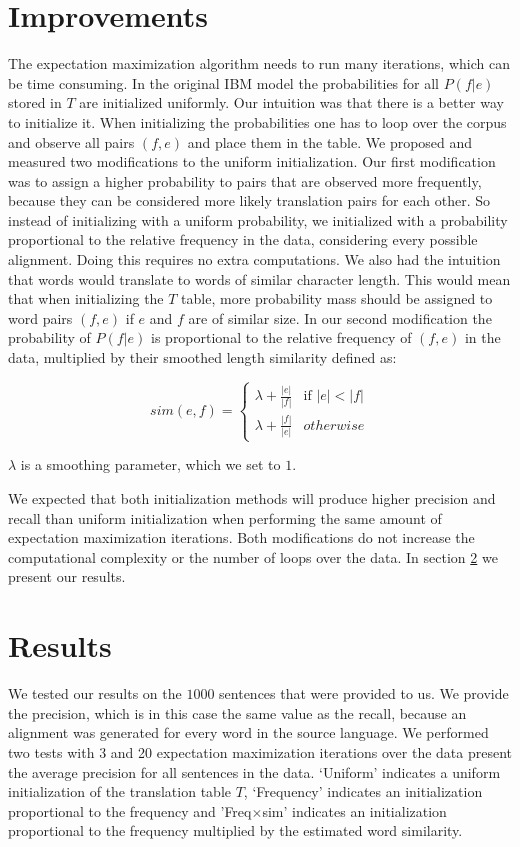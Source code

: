 \documentclass[11pt]{article}
\begin{document}
\section{Improvements}
\label{own}
The expectation maximization algorithm needs to run many iterations, which can be time consuming. In the original IBM model the probabilities for all $P(f|e)$ stored in $T$ are initialized uniformly. Our intuition was that there is a better way to initialize it. When initializing the probabilities one has to loop over the corpus and observe all pairs $(f,e)$ and place them in the table. We proposed and measured two modifications to the uniform initialization.
Our first modification was to assign a higher probability to pairs that are observed more frequently, because they can be considered more likely translation pairs for each other. So instead of initializing with a uniform probability, we initialized with a probability proportional to the relative frequency in the data, considering every possible alignment. Doing this requires no extra computations. 
We also had the intuition that words would translate to words of similar character length. This would mean that when initializing the $T$ table, more probability mass should be assigned to word pairs $(f,e)$ if $e$ and $f$ are of similar size. In our second modification the probability of $P(f|e)$ is proportional to the relative frequency of $(f,e)$ in the data, multiplied by their smoothed length similarity defined as:

$$ sim(e, f) = 
\left\{
	\begin{array}{ll}
		\lambda + \frac{|e|}{|f|} & \mbox{if } |e| < |f| \\
		\lambda + \frac{|f|}{|e|} & otherwise
	\end{array}
\right. $$

\noindent
$\lambda$ is a smoothing parameter, which we set to $1$.

We expected that both initialization methods will produce higher precision and recall than uniform initialization when performing the same amount of expectation maximization iterations. Both modifications do not increase the computational complexity or the number of loops over the data. In section \ref{results} we present our results.

\section{Results}
\label{results}
We tested our results on the $1000$ sentences that were provided to us. We provide the precision, which is in this case the same value as the recall, because an alignment was generated for every word in the source language. We performed two tests with 3 and 20 expectation maximization iterations over the data present the average precision for all sentences in the data. `Uniform' indicates a uniform initialization of the translation table $T$, `Frequency' indicates an initialization proportional to the frequency and 'Freq$\times$sim' indicates an initialization proportional to the frequency multiplied by the estimated word similarity.
\end{document}
